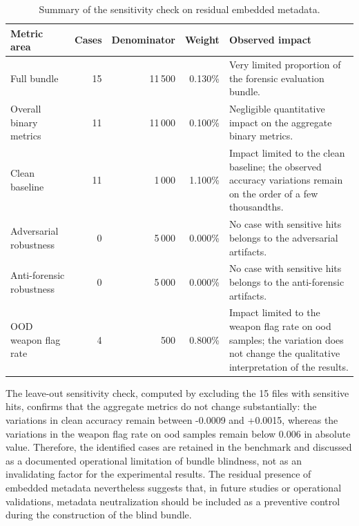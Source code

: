 \begin{table}[H]
\centering
\scriptsize
\renewcommand{\arraystretch}{1.15}
\setlength{\tabcolsep}{4pt}
\caption{Summary of the sensitivity check on residual embedded metadata.}
\label{tab:results-embedded-metadata-impact}
\begin{tabularx}{\textwidth}{@{}p{} r r r X@{}}
\toprule
\textbf{Metric area} &
\textbf{Cases} &
\textbf{Denominator} &
\textbf{Weight} &
\textbf{Observed impact} \\
\midrule

Full bundle &
15 &
11\,500 &
0.130\% &
Very limited proportion of the forensic evaluation bundle. \\

Overall binary metrics &
11 &
11\,000 &
0.100\% &
Negligible quantitative impact on the aggregate binary metrics. \\

Clean baseline &
11 &
1\,000 &
1.100\% &
Impact limited to the clean baseline; the observed accuracy variations remain
on the order of a few thousandths. \\

Adversarial robustness &
0 &
5\,000 &
0.000\% &
No case with sensitive hits belongs to the adversarial artifacts. \\

Anti-forensic robustness &
0 &
5\,000 &
0.000\% &
No case with sensitive hits belongs to the anti-forensic artifacts. \\

OOD weapon flag rate &
4 &
500 &
0.800\% &
Impact limited to the weapon flag rate on \gls{ood} samples; the variation does
not change the qualitative interpretation of the results. \\

\bottomrule
\end{tabularx}
\end{table}

The leave-out sensitivity check, computed by excluding the 15 files with
sensitive hits, confirms that the aggregate metrics do not change substantially:
the variations in clean accuracy remain between -0.0009 and +0.0015, whereas
the variations in the weapon flag rate on \gls{ood} samples remain below 0.006
in absolute value. Therefore, the identified cases are retained in the benchmark
and discussed as a documented operational limitation of bundle blindness, not
as an invalidating factor for the experimental results. The residual presence
of embedded metadata nevertheless suggests that, in future studies or
operational validations, metadata neutralization should be included as a
preventive control during the construction of the blind bundle.

